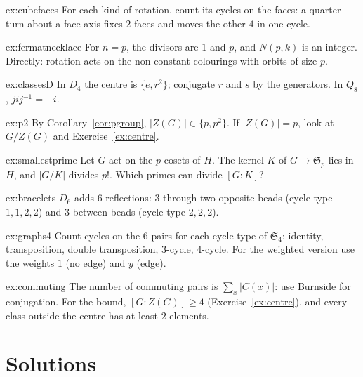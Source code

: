 \begin{hint}{ex:cubefaces}
For each kind of rotation, count its cycles on the faces: a quarter turn about a face axis fixes $2$ faces and moves the other $4$ in one cycle.
\end{hint}
\begin{hint}{ex:fermatnecklace}
For $n=p$, the divisors are $1$ and $p$, and $N(p,k)$ is an integer. Directly: rotation acts on the non-constant colourings with orbits of size $p$.
\end{hint}
\begin{hint}{ex:classesD}
In $D_4$ the centre is $\{e,r^2\}$; conjugate $r$ and $s$ by the generators. In $Q_8$, $jij^{-1}=-i$.
\end{hint}
\begin{hint}{ex:p2}
By Corollary~\ref{cor:pgroup}, $|Z(G)|\in\{p,p^2\}$. If $|Z(G)|=p$, look at $G/Z(G)$ and Exercise~\ref{ex:centre}.
\end{hint}
\begin{hint}{ex:smallestprime}
Let $G$ act on the $p$ cosets of $H$. The kernel $K$ of $G\to\mathfrak S_p$ lies in $H$, and $|G/K|$ divides $p!$. Which primes can divide $[G:K]$?
\end{hint}
\begin{hint}{ex:bracelets}
$D_6$ adds $6$ reflections: $3$ through two opposite beads (cycle type $1,1,2,2$) and $3$ between beads (cycle type $2,2,2$).
\end{hint}
\begin{hint}{ex:graphs4}
Count cycles on the $6$ pairs for each cycle type of $\mathfrak S_4$: identity, transposition, double transposition, $3$-cycle, $4$-cycle. For the weighted version use the weights $1$ (no edge) and $y$ (edge).
\end{hint}
\begin{hint}{ex:commuting}
The number of commuting pairs is $\sum_x|C(x)|$: use Burnside for conjugation. For the bound, $[G:Z(G)]\ge4$ (Exercise~\ref{ex:centre}), and every class outside the centre has at least $2$ elements.
\end{hint}

\section{Solutions}

